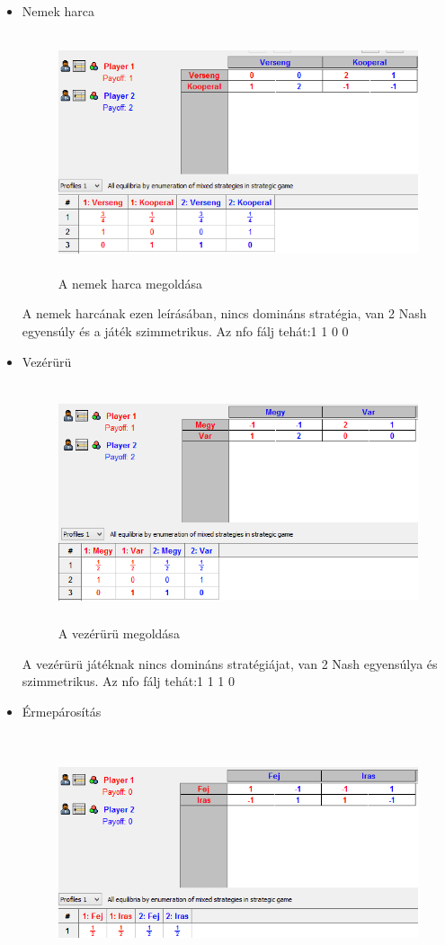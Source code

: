 \begin{itemize}
\item Nemek harca
		\begin{figure}[h]
		\begin{center}
		\includegraphics[height=7cm]{figures/nemek.png}
		\caption{A nemek harca megoldása}
		\end{center}
		\end{figure}
A nemek harcának ezen leírásában, nincs domináns stratégia, van 2 Nash egyensúly és a játék szimmetrikus. Az nfo fálj tehát:1	1	0 0
\item Vezérürü
		\begin{figure}[h]
		\begin{center}
		\includegraphics[height=7cm]{figures/uru.png}
		\caption{A vezérürü megoldása}
		\end{center}
		\end{figure}
A vezérürü játéknak nincs domináns stratégiájat, van 2 Nash egyensúlya és szimmetrikus. 
Az nfo fálj tehát:1	1	1 0
\item Érmepárosítás
		\begin{figure}[h]
		\begin{center}
		\includegraphics[height=7cm]{figures/erme.png}

\end{center}
\end{figure}
\end{itemize}
